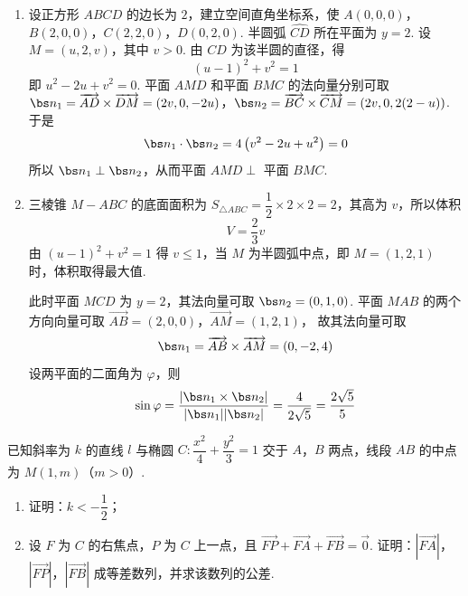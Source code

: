 \begin{solution}
\begin{enumerate}
\item 设正方形 \(ABCD\) 的边长为 \(2\)，建立空间直角坐标系，使
\(A(0,0,0)\)，\(B(2,0,0)\)，\(C(2,2,0)\)，\(D(0,2,0)\).
半圆弧 \(\widehat{CD}\) 所在平面为 \(y=2\). 设 \(M=(u,2,v)\)，其中 \(v>0\). 由 \(CD\) 为该半圆的直径，得
\[
(u-1)^2+v^2=1
\]
即 \(u^2-2u+v^2=0\). 平面 \(AMD\) 和平面 \(BMC\) 的法向量分别可取
\(\bs n_1=\overrightarrow{AD}\times\overrightarrow{DM}=(2v,0,-2u)\)，\(\bs n_2=\overrightarrow{BC}\times\overrightarrow{CM}=(2v,0,2(2-u))\).
于是
\[
\bs n_1\cdot\bs n_2=4\left(v^2-2u+u^2\right)=0
\]
所以 \(\bs n_1\perp\bs n_2\)，从而平面 \(AMD\perp\) 平面 \(BMC\).
\item 三棱锥 \(M-ABC\) 的底面面积为 \(S_{\triangle ABC}=\dfrac12\times2\times2=2\)，其高为 \(v\)，所以体积
\[
V=\dfrac23v
\]
由 \((u-1)^2+v^2=1\) 得 \(v\le1\)，当 \(M\) 为半圆弧中点，即 \(M=(1,2,1)\) 时，体积取得最大值.

此时平面 \(MCD\) 为 \(y=2\)，其法向量可取 \(\bs n_2=(0,1,0)\). 平面 \(MAB\) 的两个方向向量可取
\(\overrightarrow{AB}=(2,0,0)\)，\(\overrightarrow{AM}=(1,2,1)\)，
故其法向量可取
\[
\bs n_1=\overrightarrow{AB}\times\overrightarrow{AM}=(0,-2,4)
\]
设两平面的二面角为 \(\varphi\)，则
\[
\sin\varphi=\dfrac{|\bs n_1\times\bs n_2|}{|\bs n_1||\bs n_2|}
=\dfrac{4}{2\sqrt5}=\dfrac{2\sqrt5}{5}
\]
\end{enumerate}
\end{solution}

\begin{problem}
已知斜率为 \(k\) 的直线 \(l\) 与椭圆 \(C:\dfrac{x^2}{4}+\dfrac{y^2}{3}=1\) 交于 \(A\)，\(B\) 两点，线段 \(AB\) 的中点为 \(M(1,m)\)（\(m>0\)）.

\begin{enumerate}
\item 证明：\(k<-\dfrac12\)；
\item 设 \(F\) 为 \(C\) 的右焦点，\(P\) 为 \(C\) 上一点，且 \(\overrightarrow{FP}+\overrightarrow{FA}+\overrightarrow{FB}=\overrightarrow{0}\). 证明：\(\left|\overrightarrow{FA}\right|\)，\(\left|\overrightarrow{FP}\right|\)，\(\left|\overrightarrow{FB}\right|\) 成等差数列，并求该数列的公差.
\end{enumerate}
\end{problem}

